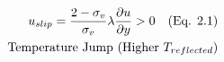 \documentclass[preview]{standalone}
\begin{document}
\begin{align*}
\special{dvisvgm:raw <g id='unique000'>}u_{slip} = \frac{2-\sigma_v}{\sigma_v} \lambda \frac{\partial u}{\partial y} > 0 \quad \text{(Eq. 2.1)}\\\text{Temperature Jump (Higher } T_{reflected}\text{)}\special{dvisvgm:raw </g>}
\end{align*}
\end{document}
